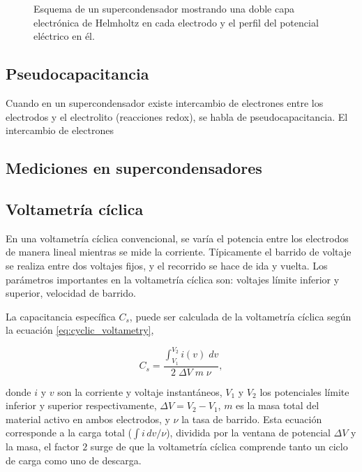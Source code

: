 \begin{figure}[h!]
	\centering
	\caption[Esquema de un supercondensador]{Esquema de un supercondensador mostrando una doble capa electrónica de Helmholtz en cada electrodo y el perfil del potencial eléctrico en él.}
	\label{fig:edlc}
\end{figure}

\subsection{Pseudocapacitancia}
Cuando en un supercondensador existe intercambio de electrones entre los electrodos y el electrolito (reacciones redox), se habla de pseudocapacitancia. El intercambio de electrones 


\subsection{Mediciones en supercondensadores}

\subsection{Voltametría cíclica}
En una voltametría cíclica convencional, se varía el potencia entre los electrodos de manera lineal mientras se mide la corriente. Típicamente el barrido de voltaje se realiza entre dos voltajes fijos, y el recorrido se hace de ida y vuelta. Los parámetros importantes en la voltametría cíclica son: voltajes límite inferior y superior, velocidad de barrido.

La capacitancia específica $C_s$, puede ser calculada de la voltametría cíclica según la ecuación \ref{eq:cyclic_voltametry},

\begin{equation}\label{eq:cyclic_voltametry}
	C_{s} = \frac{\int_{V_1}^{V_2}i(v) \; dv}{2 \; \Delta V \; m \; \nu },
\end{equation}

donde $i$ y $v$ son la corriente y voltaje instantáneos, $V_1$ y $V_2$ los potenciales límite inferior y superior respectivamente, $\Delta V = V_2 - V_1 $, $m$ es la masa total del material activo en ambos electrodos, y $\nu$ la tasa de barrido. Esta ecuación corresponde a la carga total ($\int i\, dv / \nu$), dividida por la ventana de potencial $\Delta V$ y la masa, el factor $2$ surge de que la voltametría cíclica comprende tanto un ciclo de carga como uno de descarga.

